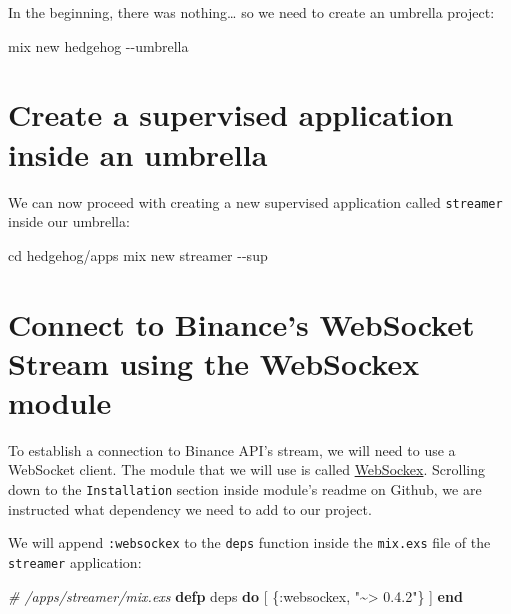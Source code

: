 \documentclass[
]{book}
\newenvironment{Shaded}{\begin{snugshade}}{\end{snugshade}}
\newcommand{\AttributeTok}[1]{\textcolor[rgb]{0.77,0.63,0.00}{#1}}
\newcommand{\BuiltInTok}[1]{#1}
\newcommand{\CommentTok}[1]{\textcolor[rgb]{0.56,0.35,0.01}{\textit{#1}}}
\newcommand{\ExtensionTok}[1]{#1}
\newcommand{\KeywordTok}[1]{\textcolor[rgb]{0.13,0.29,0.53}{\textbf{#1}}}
\newcommand{\NormalTok}[1]{#1}
\newcommand{\StringTok}[1]{\textcolor[rgb]{0.31,0.60,0.02}{#1}}
\newcommand{\VariableTok}[1]{\textcolor[rgb]{0.00,0.00,0.00}{#1}}
\begin{document}
In the beginning, there was nothing\ldots{} so we need to create an umbrella project:

\begin{Shaded}
\begin{Highlighting}[]
\ExtensionTok{mix}\NormalTok{ new hedgehog }\AttributeTok{{-}{-}umbrella}
\end{Highlighting}
\end{Shaded}

\hypertarget{create-a-supervised-application-inside-an-umbrella}{%
\section{Create a supervised application inside an umbrella}\label{create-a-supervised-application-inside-an-umbrella}}

We can now proceed with creating a new supervised application called \texttt{streamer} inside our umbrella:

\begin{Shaded}
\begin{Highlighting}[]
\BuiltInTok{cd}\NormalTok{ hedgehog/apps}
\ExtensionTok{mix}\NormalTok{ new streamer }\AttributeTok{{-}{-}sup}
\end{Highlighting}
\end{Shaded}

\hypertarget{connect-to-binances-websocket-stream-using-the-websockex-module}{%
\section{Connect to Binance's WebSocket Stream using the WebSockex module}\label{connect-to-binances-websocket-stream-using-the-websockex-module}}

To establish a connection to Binance API's stream, we will need to use a WebSocket client. The module that we will use is called \href{https://github.com/Azolo/websockex}{WebSockex}. Scrolling down to the \texttt{Installation} section inside module's readme on Github, we are instructed what dependency we need to add to our project.

We will append \texttt{:websockex} to the \texttt{deps} function inside the \texttt{mix.exs} file of the \texttt{streamer} application:

\begin{Shaded}
\begin{Highlighting}[]
  \CommentTok{\# /apps/streamer/mix.exs}
  \KeywordTok{defp}\NormalTok{ deps }\KeywordTok{do}
\NormalTok{    [}
\NormalTok{      \{}\VariableTok{:websockex}\NormalTok{, }\StringTok{"\textasciitilde{}\textgreater{} 0.4.2"}\NormalTok{\}}
\NormalTok{    ]}
  \KeywordTok{end}
\end{Highlighting}
\end{Shaded}
\end{document}
